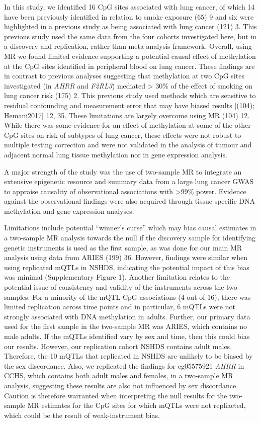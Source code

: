 \documentclass[11pt,oneside]{bristolthesis}
\begin{document}
In this study, we identified 16 CpG sites associated with lung cancer, of which 14 have been previously identified in relation to smoke exposure (65) 9 and six were highlighted in a previous study as being associated with lung cancer (121) 3. This previous study used the same data from the four cohorts investigated here, but in a discovery and replication, rather than meta-analysis framework. Overall, using MR we found limited evidence supporting a potential causal effect of methylation at the CpG sites identified in peripheral blood on lung cancer. These findings are in contrast to previous analyses suggesting that methylation at two CpG sites investigated (in \emph{AHRR} and \emph{F2RL3}) mediated \textgreater{} 30\% of the effect of smoking on lung cancer risk (175) 2. This previous study used methods which are sensitive to residual confounding and measurement error that may have biased results {[}(104); Hemani2017{]} 12, 35. These limitations are largely overcome using MR (104) 12. While there was some evidence for an effect of methylation at some of the other CpG sites on risk of subtypes of lung cancer, these effects were not robust to multiple testing correction and were not validated in the analysis of tumour and adjacent normal lung tissue methylation nor in gene expression analysis.

A major strength of the study was the use of two-sample MR to integrate an extensive epigenetic resource and summary data from a large lung cancer GWAS to appraise causality of observational associations with \textgreater99\% power. Evidence against the observational findings were also acquired through tissue-specific DNA methylation and gene expression analyses.

Limitations include potential ``winner's curse'' which may bias causal estimates in a two-sample MR analysis towards the null if the discovery sample for identifying genetic instruments is used as the first sample, as was done for our main MR analysis using data from ARIES (199) 36. However, findings were similar when using replicated mQTLs in NSHDS, indicating the potential impact of this bias was minimal (Supplementary Figure 1). Another limitation relates to the potential issue of consistency and validity of the instruments across the two samples. For a minority of the mQTL-CpG associations (4 out of 16), there was limited replication across time points and in particular, 6 mQTLs were not strongly associated with DNA methylation in adults. Further, our primary data used for the first sample in the two-sample MR was ARIES, which contains no male adults. If the mQTLs identified vary by sex and time, then this could bias our results. However, our replication cohort NSHDS contains adult males. Therefore, the 10 mQTLs that replicated in NSHDS are unlikely to be biased by the sex discordance. Also, we replicated the findings for cg05575921 \emph{AHRR} in CCHS, which contains both adult males and females, in a two-sample MR analysis, suggesting these results are also not influenced by sex discordance. Caution is therefore warranted when interpreting the null results for the two-sample MR estimates for the CpG sites for which mQTLs were not repliacted, which could be the result of weak-instrument bias.
\end{document}

